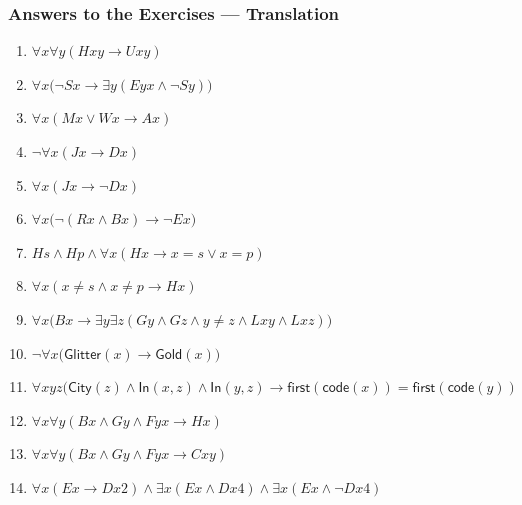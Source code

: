 \documentclass[UTF8,11pt,colorlinks,aspectratio=43]{beamer}%
\begin{document}
\begin{frame}\frametitle{Answers to the Exercises --- Translation}
\begin{enumerate}
 \item $\forall x\forall y(Hxy\to Uxy)$
 \item $\forall x\big(\neg Sx\to\exists y(Eyx\wedge \neg Sy)\big)$
 \item $\forall x(Mx\vee Wx\to Ax)$
 \item $\neg\forall x(Jx\to Dx)$
 \item $\forall x(Jx\to\neg Dx)$
 \item $\forall x\big(\neg (Rx\wedge Bx)\to \neg Ex\big)$
 \item $Hs\wedge Hp\wedge\forall x(Hx\to x=s\vee x=p)$
 \item $\forall x(x\ne s\wedge x\ne p\to Hx)$
 \item $\forall x\big(Bx\to \exists y\exists z(Gy\wedge Gz\wedge y\ne z\wedge Lxy\wedge Lxz)\big)$
 \item $\neg\forall x\big(\mathsf{Glitter}(x)\to\mathsf{Gold}(x)\big)$
 \item $\forall xyz(\mathsf{City}(z)\wedge \mathsf{In}(x,z)\wedge \mathsf{In}(y,z)\to \mathsf{first}(\mathsf{code}(x))=\mathsf{first}(\mathsf{code}(y))$
 \item $\forall x\forall y(Bx\wedge Gy\wedge Fyx\to Hx)$
 \item $\forall x\forall y(Bx\wedge Gy\wedge Fyx\to Cxy)$
 \item $\forall x(Ex\to Dx2)\wedge \exists x (Ex\wedge Dx4)\wedge \exists x (Ex\wedge\neg Dx4)$
\end{enumerate}
\end{frame}
\end{document}
